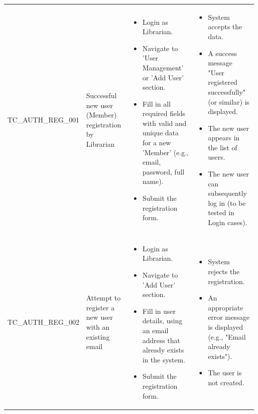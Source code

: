 \begin{longtable}{|>{\scriptsize\raggedright\arraybackslash}p{3.5cm}|>{\raggedright\arraybackslash}p{3.5cm}|>{\raggedright\arraybackslash}p{4cm}|>{\raggedright\arraybackslash}p{4cm}|}
\multicolumn{4}{|l|}{\textbf{Sub-Section: User Registration (by Librarian)}} \\ \hline
TC\_AUTH\_REG\_001 & Successful new user (Member) registration by Librarian & 
    \begin{itemize}[noitemsep, topsep=0pt, partopsep=0pt, leftmargin=*]
        \item Login as Librarian.
        \item Navigate to 'User Management' or 'Add User' section.
        \item Fill in all required fields with valid and unique data for a new 'Member' (e.g., email, password, full name). 
        \item Submit the registration form.
    \end{itemize} & 
    \begin{itemize}[noitemsep, topsep=0pt, partopsep=0pt, leftmargin=*]
        \item System accepts the data.
        \item A success message "User registered successfully" (or similar) is displayed.
        \item The new user appears in the list of users.
        \item The new user can subsequently log in (to be tested in Login cases).
    \end{itemize} \\ \hline
TC\_AUTH\_REG\_002 & Attempt to register a new user with an existing email & 
    \begin{itemize}[noitemsep, topsep=0pt, partopsep=0pt, leftmargin=*]
        \item Login as Librarian.
        \item Navigate to 'Add User' section.
        \item Fill in user details, using an email address that already exists in the system. 
        \item Submit the registration form.
    \end{itemize} & 
    \begin{itemize}[noitemsep, topsep=0pt, partopsep=0pt, leftmargin=*]
        \item System rejects the registration.
        \item An appropriate error message is displayed (e.g., "Email already exists").
        \item The user is not created.
    \end{itemize} \\ \hline

\end{longtable}
